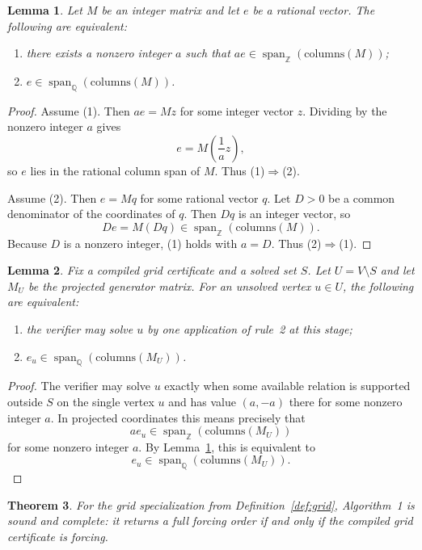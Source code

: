 \documentclass[11pt]{article}
\newtheorem{theorem}{Theorem}
\newtheorem{lemma}[theorem]{Lemma}
\theoremstyle{definition}
\newcommand{\SpanQ}{\operatorname{span}_{\mathbb{Q}}}
\newcommand{\SpanZ}{\operatorname{span}_{\mathbb{Z}}}
\begin{document}
\begin{lemma}
\label{lem:int-vs-rat}
Let $M$ be an integer matrix and let $e$ be a rational vector. The following are equivalent:
\begin{enumerate}
  \item there exists a nonzero integer $a$ such that $ae\in \SpanZ(\mathrm{columns}(M))$;
  \item $e\in \SpanQ(\mathrm{columns}(M))$.
\end{enumerate}
\end{lemma}

\begin{proof}
Assume (1). Then $ae=Mz$ for some integer vector $z$. Dividing by the nonzero integer $a$ gives
\[
e=M\left(\frac{1}{a}z\right),
\]
so $e$ lies in the rational column span of $M$. Thus (1)$\Rightarrow$(2).

Assume (2). Then $e=Mq$ for some rational vector $q$. Let $D>0$ be a common denominator of the coordinates of $q$. Then $Dq$ is an integer vector, so
\[
De=M(Dq)\in \SpanZ(\mathrm{columns}(M)).
\]
Because $D$ is a nonzero integer, (1) holds with $a=D$. Thus (2)$\Rightarrow$(1).
\end{proof}

\begin{lemma}
\label{lem:single-step}
Fix a compiled grid certificate and a solved set $S$. Let $U=V\setminus S$ and let $M_U$ be the projected generator matrix. For an unsolved vertex $u\in U$, the following are equivalent:
\begin{enumerate}
  \item the verifier may solve $u$ by one application of rule~2 at this stage;
  \item $e_u\in \SpanQ(\mathrm{columns}(M_U))$.
\end{enumerate}
\end{lemma}

\begin{proof}
The verifier may solve $u$ exactly when some available relation is supported outside $S$ on the single vertex $u$ and has value $(a,-a)$ there for some nonzero integer $a$. In projected coordinates this means precisely that
\[
ae_u\in \SpanZ(\mathrm{columns}(M_U))
\]
for some nonzero integer $a$. By Lemma~\ref{lem:int-vs-rat}, this is equivalent to
\[
e_u\in \SpanQ(\mathrm{columns}(M_U)).
\]
\end{proof}

\begin{theorem}
\label{thm:verifier}
For the grid specialization from Definition~\ref{def:grid}, Algorithm~1 is sound and complete: it returns a full forcing order if and only if the compiled grid certificate is forcing.
\end{theorem}
\end{document}
